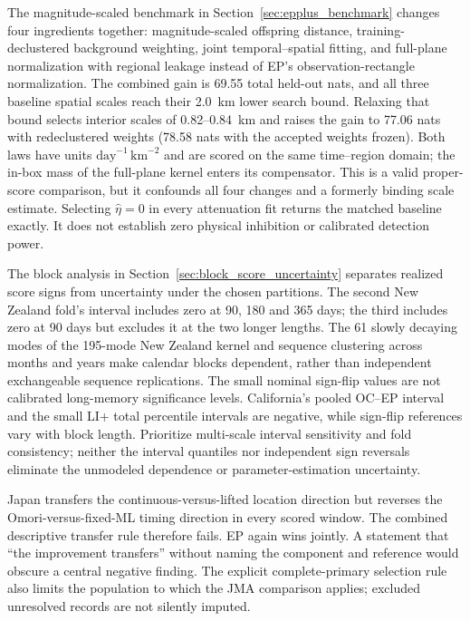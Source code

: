 The magnitude-scaled benchmark in Section~\ref{sec:epplus_benchmark} changes four ingredients together: magnitude-scaled offspring distance, training-declustered background weighting, joint temporal--spatial fitting, and full-plane normalization with regional leakage instead of EP's observation-rectangle normalization. The combined gain is 69.55 total held-out nats, and all three baseline spatial scales reach their 2.0~km lower search bound. Relaxing that bound selects interior scales of 0.82--0.84~km and raises the gain to 77.06 nats with redeclustered weights (78.58 nats with the accepted weights frozen). Both laws have units $\mathrm{day}^{-1}\,\mathrm{km}^{-2}$ and are scored on the same time--region domain; the in-box mass of the full-plane kernel enters its compensator. This is a valid proper-score comparison, but it confounds all four changes and a formerly binding scale estimate. Selecting $\hat\eta=0$ in every attenuation fit returns the matched baseline exactly. It does not establish zero physical inhibition or calibrated detection power.

The block analysis in Section~\ref{sec:block_score_uncertainty} separates realized score signs from uncertainty under the chosen partitions. The second New Zealand fold's interval includes zero at 90, 180 and 365 days; the third includes zero at 90 days but excludes it at the two longer lengths. The 61 slowly decaying modes of the 195-mode New Zealand kernel and sequence clustering across months and years make calendar blocks dependent, rather than independent exchangeable sequence replications. The small nominal sign-flip values are not calibrated long-memory significance levels. California's pooled OC--EP interval and the small LI+ total percentile intervals are negative, while sign-flip references vary with block length. Prioritize multi-scale interval sensitivity and fold consistency; neither the interval quantiles nor independent sign reversals eliminate the unmodeled dependence or parameter-estimation uncertainty.

Japan transfers the continuous-versus-lifted location direction but reverses the Omori-versus-fixed-ML timing direction in every scored window. The combined descriptive transfer rule therefore fails. EP again wins jointly. A statement that ``the improvement transfers'' without naming the component and reference would obscure a central negative finding. The explicit complete-primary selection rule also limits the population to which the JMA comparison applies; excluded unresolved records are not silently imputed.

